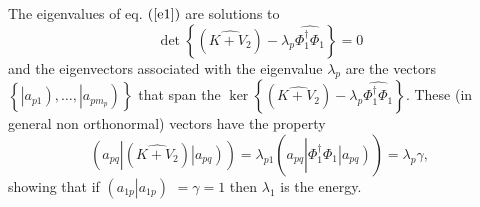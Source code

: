 \documentclass[aps,preprint]{revtex4}%
\begin{document}
The eigenvalues of eq. $\left(  \ref{e1}\right)  $ are solutions to
\begin{equation}
\det\left\{  \left(  \widehat{K+V_{2}}\right)  -\lambda_{p}\widehat{\Phi
_{1}^{\dagger}\Phi_{1}}\right\}  =0
\end{equation}
and the eigenvectors associated with the eigenvalue $\lambda_{p}$ are the
vectors $\left\{  \left\vert \overset{}{a_{p1}}\right)  ,\ldots,\left\vert
\overset{}{a_{pm_{p}}}\right)  \right\}  $ that span the $\ker\left\{  \left(
\widehat{K+V_{2}}\right)  -\lambda_{p}\widehat{\Phi_{1}^{\dagger}\Phi_{1}%
}\right\}  $. These (in general non orthonormal) vectors have the property
\begin{equation}
\left(  \overset{}{a_{pq}}\left\vert \left(  \widehat{K+V_{2}}\right)
\right.  \left\vert \overset{}{a_{pq}}\right)  \right)  =\lambda_{p1}\left(
\overset{}{a_{pq}}\left\vert \widehat{\Phi_{1}^{\dagger}\Phi_{1}}\right.
\left\vert \overset{}{a_{pq}}\right)  \right)  =\lambda_{p}\gamma,
\end{equation}
showing that if $\left(  \left.  \overset{}{a_{1p}}\right\vert \overset
{}{a_{1p}}\right)  $ $=\gamma=1$ then $\lambda_{1}$ is the energy.
\end{document}
